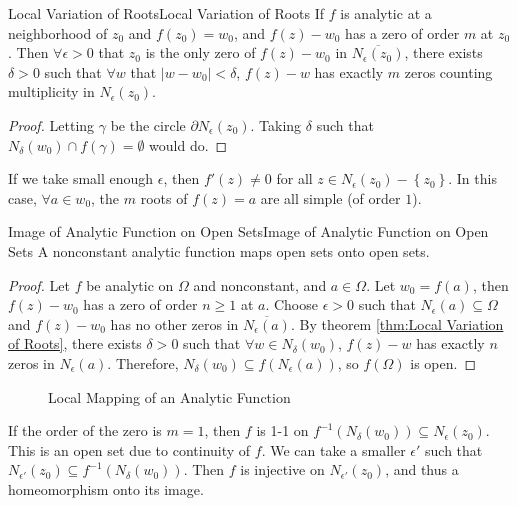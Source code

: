 \documentclass[../main.tex]{subfiles}
\begin{document}
\begin{theorem}{Local Variation of Roots}{Local Variation of Roots}
	If $f$ is analytic at a neighborhood of $z_0$ and $f(z_0)=w_0$, and $f(z)-w_0$ has a zero of order $m$ at $z_0$. Then $\forall \epsilon>0$ that $z_0$ is the only zero of $f(z)-w_0$ in $\overline{N_\epsilon(z_0)}$, there exists $\delta>0$ such that $\forall w$ that $\left|w-w_0\right|<\delta$, $f(z)-w$ has exactly $m$ zeros counting multiplicity in $N_\epsilon(z_0)$.
\end{theorem}
\begin{proof}
Letting $\gamma$ be the circle $\partial N_{\epsilon}(z_0)$. Taking $\delta$ such that $N_{\delta}(w_0)\cap f(\gamma) = \emptyset $ would do.
\end{proof}
\begin{remark}
	If we take small enough $\epsilon$, then $f'(z)\neq 0$ for all $z\in N_\epsilon(z_0)-\left\{ z_0 \right\}$. In this case, $\forall a\in w_0$, the $m$ roots of $f(z) = a$ are all simple (of order $1$).
\end{remark}

\begin{corollary}{Image of Analytic Function on Open Sets}{Image of Analytic Function on Open Sets}
A nonconstant analytic function maps open sets onto open sets.
\end{corollary}
\begin{proof}
	Let $f$ be analytic on $\Omega$ and nonconstant, and $a\in \Omega$. Let $w_0 = f(a)$, then $f(z)-w_0$ has a zero of order $n\geq 1$ at $a$. Choose $\epsilon>0$ such that $N_\epsilon(a) \subseteq \Omega$ and $f(z)-w_0$ has no other zeros in $\overline{N_\epsilon(a)}$. By theorem \ref{thm:Local Variation of Roots}, there exists $\delta>0$ such that $\forall w\in N_\delta(w_0)$, $f(z)-w$ has exactly $n$ zeros in $N_\epsilon(a)$. Therefore, $N_\delta(w_0) \subseteq f(N_\epsilon(a))$, so $f(\Omega)$ is open.
\end{proof}

\begin{figure}[ht]
    \centering
    \caption{Local Mapping of an Analytic Function}
    \label{fig:local-mapping-of-an-analytic-function}
\end{figure}


If the order of the zero is $m=1$, then $f$ is 1-1 on $f^{-1}(N_{\delta}(w_0)) \subseteq N_{\epsilon}(z_0)$. This is an open set due to continuity of $f$. We can take a smaller $\epsilon'$ such that $N_{\epsilon'}(z_0) \subseteq f^{-1}(N_{\delta}(w_0))$. Then $f$ is injective on $N_{\epsilon'}(z_0)$, and thus a homeomorphism onto its image.
\end{document}
